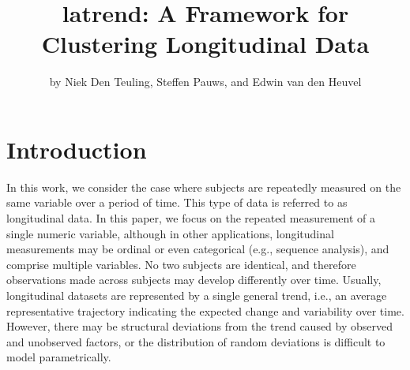 \title{latrend: A Framework for Clustering Longitudinal Data}


\author{by Niek Den Teuling, Steffen Pauws, and Edwin van den Heuvel}

\maketitle


\section{Introduction}\label{sec:intro}

In this work, we consider the case where subjects are repeatedly measured on the same variable over a period of time. This type of data is referred to as longitudinal data. In this paper, we focus on the repeated measurement of a single numeric variable, although in other applications, longitudinal measurements may be ordinal or even categorical (e.g., sequence analysis), and comprise multiple variables. No two subjects are identical, and therefore observations made across subjects may develop differently over time. Usually, longitudinal datasets are represented by a single general trend, i.e., an average representative trajectory indicating the expected change and variability over time. However, there may be structural deviations from the trend caused by observed and unobserved factors, or the distribution of random deviations is difficult to model parametrically.

